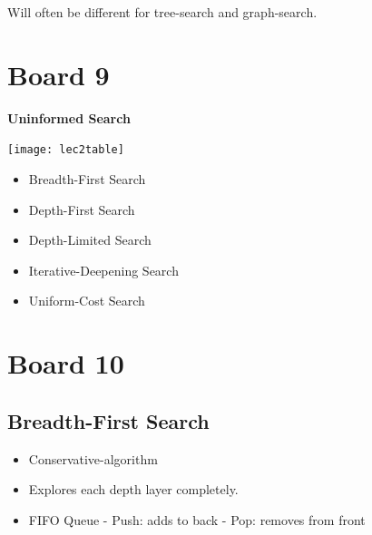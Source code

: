 \documentclass[10pt]{article}
\begin{document}
Will often be different for tree-search and graph-search. 



\section{Board 9}

\textbf{Uninformed Search}

\texttt{[image: lec2table]}
\begin{itemize}
\item Breadth-First Search
\item Depth-First Search
\item Depth-Limited Search
\item Iterative-Deepening Search
\item Uniform-Cost Search
\end{itemize}



\section{Board 10}

\subsection{Breadth-First Search}

\begin{itemize}
\item Conservative-algorithm
\item Explores each depth layer completely.  
\item FIFO Queue
- Push: adds to back 
- Pop: removes from front
\end{itemize}
\end{document}
